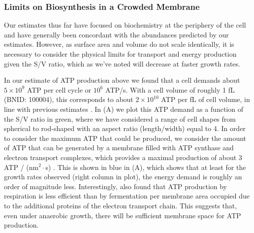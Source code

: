 \subsubsection{Limits on Biosynthesis in a Crowded Membrane}
Our estimates thus far have focused on biochemistry at the periphery of the
cell and have generally been concordant with the abundances predicted by our
estimates.
However, as surface area
and volume do not scale identically, it is necessary to consider the physical
limits for transport and energy production given the S/V ratio, which
as we've noted will decrease at faster growth rates.



In our estimate of ATP production above we found that a cell demands about $5
\times 10^9$ ATP per cell cycle or $10^6$ ATP/s. With a cell volume of roughly 1
fL (BNID: 100004), this corresponds to about $2 \times 10^{10}$ ATP per fL of cell volume, in
line with previous estimates \citep{stouthamer1977, szenk2017}. In
 (A) we plot this ATP demand as a function of the S/V ratio
in green, where we have considered a range of cell shapes from spherical to
rod-shaped with an aspect ratio (length/width) equal to 4. In order to consider
the maximum ATP that could be produced, we consider the amount of ATP that can
be generated by a membrane filled with ATP synthase and electron transport
complexes, which provides a maximal production of about 3 ATP / (nm$^2 \cdot$s)
\citep{szenk2017}. This is shown in blue in (A), which shows
that at least for the growth rates observed (right column in plot), the energy
demand is roughly an order of magnitude less. Interestingly, \cite{szenk2017}
also found that ATP production by respiration is less efficient than by
fermentation per membrane area occupied due to the additional proteins of the
electron transport chain. This suggests that, even under anaerobic growth, there
will be sufficient membrane space for ATP production.

